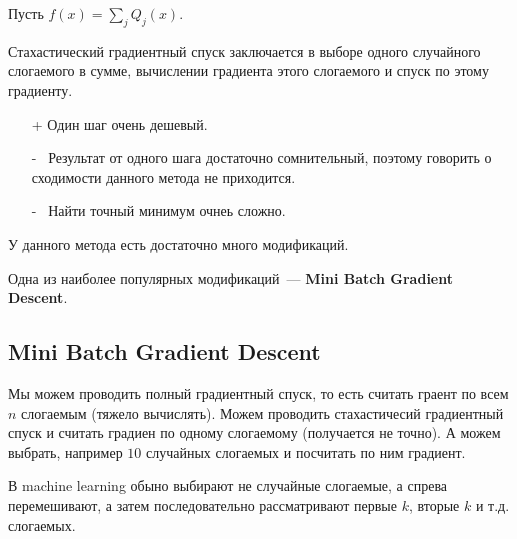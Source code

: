 \begin{definition}
    Пусть $f(x) = \sum\limits_j Q_j (x)$.

    Стахастический градиентный спуск заключается в выборе одного случайного слогаемого в сумме, вычислении градиента этого слогаемого и спуск по этому градиенту.
\end{definition}

\begin{itemize}
    \item[+] Один шаг очень дешевый.
    \item[-~] Результат от одного шага достаточно сомнительный,  поэтому говорить о сходимости данного метода не приходится.
    \item[-~] Найти точный минимум очнеь сложно.
\end{itemize}

У данного метода есть достаточно много модификаций.

Одна из наиболее популярных модификаций~--- \textbf{Mini Batch Gradient Descent}.
\subsection{Mini Batch Gradient Descent}
Мы можем проводить полный градиентный спуск, то есть считать граент по всем $n$ слогаемым (тяжело вычислять). Можем проводить стахастичесий градиентный спуск и считать градиен по одному слогаемому (получается не точно). А можем выбрать, например $10$ случайных слогаемых и посчитать по ним градиент.

В machine learning обыно выбирают не случайные слогаемые, а спрева перемешивают, а затем последовательно рассматривают первые $k$, вторые $k$ и т.д. слогаемых.
